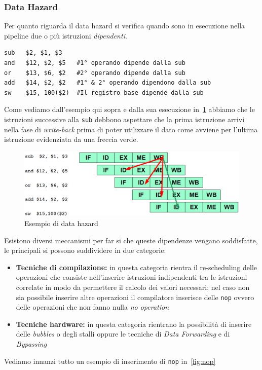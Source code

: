 \subsubsection{Data Hazard}
Per quanto riguarda il data hazard si verifica quando sono in esecuzione nella pipeline due o più istruzioni \emph{dipendenti}.
\begin{verbatim}
sub   $2, $1, $3
and   $12, $2, $5   #1° operando dipende dalla sub
or    $13, $6, $2   #2° operando dipende dalla sub
add   $14, $2, $2   #1° & 2° operando dipendono dalla sub
sw    $15, 100($2)  #Il registro base dipende dalla sub
\end{verbatim}
Come vediamo dall'esempio qui sopra e dalla sua esecuzione in \figurename\,\ref{fig:datahazard} abbiamo che le istruzioni successive alla \texttt{sub} debbono aspettare che la prima istruzione arrivi nella fase di \emph{write-back} prima di poter utilizzare il dato come avviene per l'ultima istruzione evidenziata da una freccia verde.
\begin{figure}[htb]
\centering
\includegraphics[scale=0.5]{img/datahazard.png}
\caption{Esempio di data hazard}\label{fig:datahazard}
\end{figure}
Esistono diversi meccanismi per far si che queste dipendenze vengano soddisfatte, le principali si possono suddividere in due categorie:
\begin{itemize}
\item \textbf{Tecniche di compilazione:} in questa categoria rientra il re-scheduling delle operazioni che consiste nell'inserire istruzioni indipendenti tra le istruzioni correlate in modo da permettere il calcolo dei valori necessari; nel caso non sia possibile inserire altre operazioni il compilatore inserisce delle \texttt{nop} ovvero delle operazioni che non fanno nulla \emph{no operation}
\item \textbf{Tecniche hardware:} in questa categoria rientrano la possibilità di inserire delle \emph{bubbles} o degli stalli oppure le tecniche di \emph{Data Forwarding} e di \emph{Bypassing}
\end{itemize}
Vediamo innanzi tutto un esempio di inserimento di \texttt{nop} in \figurename\,\ref{fig:nop}
